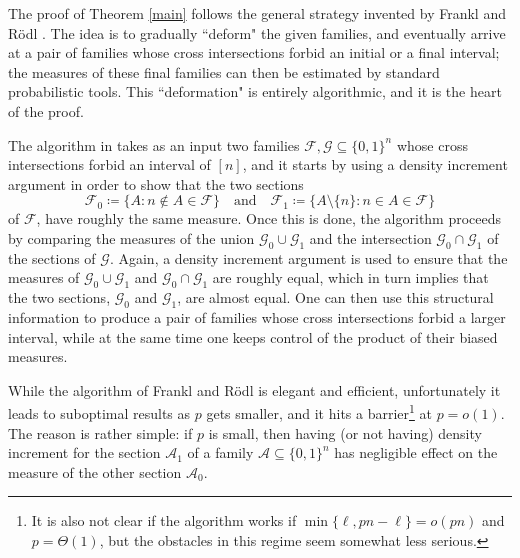 \documentclass[10pt]{amsart}
\theoremstyle{remark}
\newcommand{\Fcal}{\mathcal{F}}
\newcommand{\Gcal}{\mathcal{G}}
\begin{document}
The proof of Theorem \ref{main} follows the general strategy invented by Frankl and R\"{o}dl \cite{FR87}.
The idea is to gradually ``deform" the given families, and eventually arrive at a pair of families whose
cross intersections forbid an initial or a final interval; the measures of these final families can then
be estimated by standard probabilistic tools. This ``deformation" is entirely algorithmic,
and it is the heart of the proof.

The algorithm in \cite{FR87} takes as an input two families $\Fcal,\Gcal\subseteq \{0,1\}^n$
whose cross intersections forbid an interval of $[n]$, and it starts by using a density increment
argument in order to show that the two sections
\[ \Fcal_0\coloneqq \{A: n\notin A\in\Fcal\} \ \ \ \text{ and } \ \ \
\Fcal_1\coloneqq \big\{A\setminus\{n\}: n\in A\in\mathcal{F}\big\} \]
of $\Fcal$, have roughly the same measure. Once this is done, the algorithm proceeds by comparing the measures
of the union $\Gcal_0\cup \Gcal_1$ and the intersection $\Gcal_0\cap \Gcal_1$ of the sections of $\Gcal$.
Again, a density increment argument is used to ensure that the measures of $\Gcal_0\cup \Gcal_1$ and
$\Gcal_0\cap \Gcal_1$ are roughly equal, which in turn implies that the two sections, $\Gcal_0$ and
$\Gcal_1$, are almost equal. One can then use this structural information to produce a pair
of families whose cross intersections forbid a larger interval, while at the same time one keeps
control of the product of their biased measures.

While the algorithm of Frankl and R\"{o}dl is elegant and efficient, unfortunately it leads
to suboptimal results as $p$ gets smaller, and it hits a barrier\footnote{It is also not clear
if the algorithm works if $\min\{\ell,pn-\ell\}=o(pn)$ and $p=\Theta(1)$, but the obstacles in this regime
seem somewhat less serious.} at $p=o(1)$. The reason is rather simple: if $p$ is small,
then having (or not having) density increment for the section $\mathcal{A}_1$ of a family
$\mathcal{A}\subseteq \{0,1\}^n$ has negligible effect on the measure of the other section $\mathcal{A}_0$.
\end{document}
